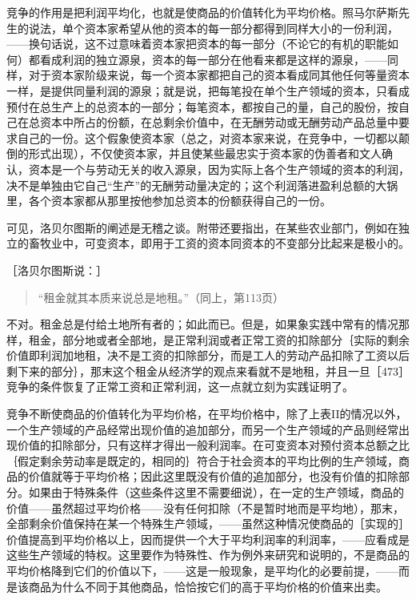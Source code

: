 竞争的作用是把利润平均化，也就是使商品的价值转化为平均价格。照马尔萨斯先生的说法，单个资本家希望从他的资本的每一部分都得到同样大小的一份利润，——换句话说，这不过意味着资本家把资本的每一部分（不论它的有机的职能如何）都看成利润的独立源泉，资本的每一部分在他看来都是这样的源泉，——同样，对于资本家阶级来说，每一个资本家都把自己的资本看成同其他任何等量资本一样，是提供同量利润的源泉；就是说，把每笔投在单个生产领域的资本，只看成预付在总生产上的总资本的一部分；每笔资本，都按自己的量，自己的股份，按自己在总资本中所占的份额，在总剩余价值中，在无酬劳动或无酬劳动产品总量中要求自己的一份。这个假象使资本家（总之，对资本家来说，在竞争中，一切都以颠倒的形式出现），不仅使资本家，并且使某些最忠实于资本家的伪善者和文人确认，资本是一个与劳动无关的收入源泉，因为实际上各个生产领域的资本的利润，决不是单独由它自己“生产”的无酬劳动量决定的；这个利润落进盈利总额的大锅里，各个资本家都从那里按他参加总资本的份额获得自己的一份。

可见，洛贝尔图斯的阐述是无稽之谈。附带还要指出，在某些农业部门，例如在独立的畜牧业中，可变资本，即用于工资的资本同资本的不变部分比起来是极小的。

［洛贝尔图斯说：］

\begin{quote}{“租金就其本质来说总是地租。”（同上，第113页）}\end{quote}

不对。租金总是付给土地所有者的；如此而已。但是，如果象实践中常有的情况那样，租金，部分地或者全部地，是正常利润或者正常工资的扣除部分｛实际的剩余价值即利润加地租，决不是工资的扣除部分，而是工人的劳动产品扣除了工资以后剩下来的部分｝，那末这个租金从经济学的观点来看就不是地租，并且一旦［473］竞争的条件恢复了正常工资和正常利润，这一点就立刻为实践证明了。

竞争不断使商品的价值转化为平均价格，在平均价格中，除了上表II的情况以外，一个生产领域的产品经常出现价值的追加部分，而另一个生产领域的产品则经常出现价值的扣除部分，只有这样才得出一般利润率。在可变资本对预付资本总额之比｛假定剩余劳动率是既定的，相同的｝符合于社会资本的平均比例的生产领域，商品的价值就等于平均价格；因此这里既没有价值的追加部分，也没有价值的扣除部分。如果由于特殊条件（这些条件这里不需要细说），在一定的生产领域，商品的价值——虽然超过平均价格——没有任何扣除（不是暂时地而是平均地），那末，全部剩余价值保持在某一个特殊生产领域，——虽然这种情况使商品的［实现的］价值提高到平均价格以上，因而提供一个大于平均利润率的利润率，——应看成是这些生产领域的特权。这里要作为特殊性、作为例外来研究和说明的，不是商品的平均价格降到它们的价值以下，——这是一般现象，是平均化的必要前提，——而是该商品为什么不同于其他商品，恰恰按它们的高于平均价格的价值来出卖。


